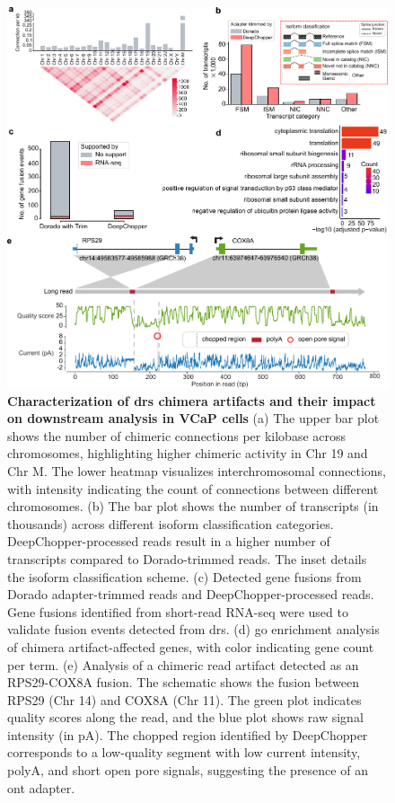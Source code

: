 \documentclass[pdflatex,sn-nature, lineno]{sn-jnl}%
\begin{document}
\begin{figure}[!ht]
	\includegraphics[height=1\columnwidth]{finals/figure2}
	\caption{{\bf Characterization of \gls{drs} chimera artifacts and their impact on downstream analysis in VCaP cells} (a) The upper bar plot shows the number of chimeric connections per kilobase across chromosomes, highlighting higher chimeric activity in Chr 19 and Chr M. The lower heatmap visualizes interchromosomal connections, with intensity indicating the count of connections between different chromosomes. (b) The bar plot shows the number of transcripts (in thousands) across different isoform classification categories. DeepChopper-processed reads result in a higher number of transcripts compared to Dorado-trimmed reads. The inset details the isoform classification scheme. (c) Detected gene fusions from Dorado adapter-trimmed reads and DeepChopper-processed reads. Gene fusions identified from short-read RNA-seq were used to validate fusion events detected from \gls{drs}. (d) \gls{go} enrichment analysis of chimera artifact-affected genes, with color indicating gene count per term. (e) Analysis of a chimeric read artifact detected as an RPS29-COX8A fusion. The schematic shows the fusion between RPS29 (Chr 14) and COX8A (Chr 11). The green plot indicates quality scores along the read, and the blue plot shows raw signal intensity (in pA). The chopped region identified by DeepChopper corresponds to a low-quality segment with low current intensity, polyA, and short open pore signals, suggesting the presence of an \gls{ont} adapter.}\label{fig:f2}
\end{figure}
\end{document}
